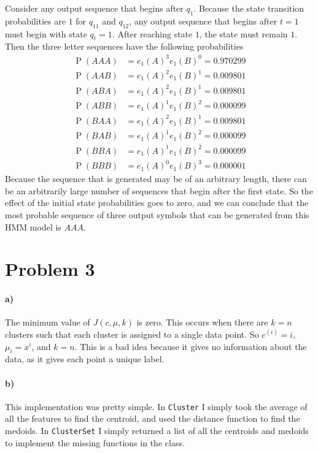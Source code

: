 \documentclass[12pt]{article}
\begin{document}
Consider any output sequence that begins after \(q_1\). Because the state transition probabilities are \(1\) for \(q_{11}\)
and \(q_{12}\), any output sequence that begins after \(t=1\) must begin with state \(q_t=1\). After reaching state \(1\),
the state must remain \(1\). Then the three letter sequences have the following probabilities
\begin{align*}
        \operatorname{P}(AAA)&=e_1(A)^3e_1(B)^0=0.970299\\
        \operatorname{P}(AAB)&=e_1(A)^2e_1(B)^1=0.009801\\
        \operatorname{P}(ABA)&=e_1(A)^2e_1(B)^1=0.009801\\
        \operatorname{P}(ABB)&=e_1(A)^1e_1(B)^2=0.000099\\
        \operatorname{P}(BAA)&=e_1(A)^2e_1(B)^1=0.009801\\
        \operatorname{P}(BAB)&=e_1(A)^1e_1(B)^2=0.000099\\
        \operatorname{P}(BBA)&=e_1(A)^1e_1(B)^2=0.000099\\
        \operatorname{P}(BBB)&=e_1(A)^0e_1(B)^3=0.000001
\end{align*}
Because the sequence that is generated may be of an arbitrary length, there can be an arbitrarily large number of sequences that
begin after the first state. So the effect of the initial state probabilities goes to zero, and we can conclude that the most
probable sequence of three output symbols that can be generated from this HMM model is \(AAA\).

\section*{Problem 3}

\paragraph{a)}

The minimum value of \(J(c,\mu,k)\) is zero. This occurs when there are \(k=n\) clusters such that each cluster is assigned to a single data point.
So \(c^{(i)}=i\), \(\mu_i=x^{i}\), and \(k=n\). This is a bad idea because it gives no information about the data, as it gives each point a unique label.

\paragraph{b)}

This implementation was pretty simple. In \texttt{Cluster} I simply took the average of all the features to find the centroid, and used the distance function
to find the medoids. In \texttt{ClusterSet} I simply returned a list of all the centroids and medoids to implement the missing functions in the class.
\end{document}
